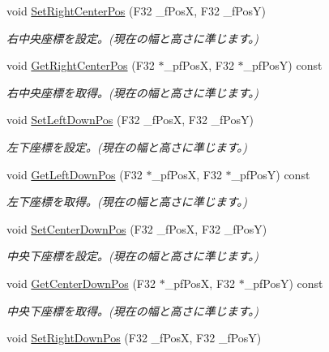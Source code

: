 \begin{DoxyCompactItemize}
void \hyperlink{class_c_rect_adfd3f9e461fb4fc6310c858f74f80c34}{Set\+Right\+Center\+Pos} (F32 \+\_\+f\+Pos\+X, F32 \+\_\+f\+Pos\+Y)
\begin{DoxyCompactList}\small\item\em 右中央座標を設定。(現在の幅と高さに準じます。) \end{DoxyCompactList}\item 
void \hyperlink{class_c_rect_aa2283d8c8101c1f855964e873ad42d46}{Get\+Right\+Center\+Pos} (F32 $\ast$\+\_\+pf\+Pos\+X, F32 $\ast$\+\_\+pf\+Pos\+Y) const 
\begin{DoxyCompactList}\small\item\em 右中央座標を取得。(現在の幅と高さに準じます。) \end{DoxyCompactList}\item 
void \hyperlink{class_c_rect_a369db01e69b5ec5cf73c0a239fc20409}{Set\+Left\+Down\+Pos} (F32 \+\_\+f\+Pos\+X, F32 \+\_\+f\+Pos\+Y)
\begin{DoxyCompactList}\small\item\em 左下座標を設定。(現在の幅と高さに準じます。) \end{DoxyCompactList}\item 
void \hyperlink{class_c_rect_ab9dfed8d7f318fc41675265ceb7fded2}{Get\+Left\+Down\+Pos} (F32 $\ast$\+\_\+pf\+Pos\+X, F32 $\ast$\+\_\+pf\+Pos\+Y) const 
\begin{DoxyCompactList}\small\item\em 左下座標を取得。(現在の幅と高さに準じます。) \end{DoxyCompactList}\item 
void \hyperlink{class_c_rect_a242e048425b04ec842a21bce31720acf}{Set\+Center\+Down\+Pos} (F32 \+\_\+f\+Pos\+X, F32 \+\_\+f\+Pos\+Y)
\begin{DoxyCompactList}\small\item\em 中央下座標を設定。(現在の幅と高さに準じます。) \end{DoxyCompactList}\item 
void \hyperlink{class_c_rect_a90e31bf3ccbeb98eebec85f171c0b4b0}{Get\+Center\+Down\+Pos} (F32 $\ast$\+\_\+pf\+Pos\+X, F32 $\ast$\+\_\+pf\+Pos\+Y) const 
\begin{DoxyCompactList}\small\item\em 中央下座標を取得。(現在の幅と高さに準じます。) \end{DoxyCompactList}\item 
void \hyperlink{class_c_rect_ae46f40fca7748e66f94d7430d8bbfe12}{Set\+Right\+Down\+Pos} (F32 \+\_\+f\+Pos\+X, F32 \+\_\+f\+Pos\+Y)

\end{DoxyCompactItemize}
